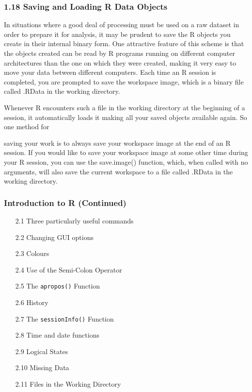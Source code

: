 \documentclass{beamer}
\begin{document}
 	\begin{frame}
 		\frametitle{1.18 Saving and Loading R Data Objects}
 		In situations where a good deal of processing must be used on a raw dataset in order to prepare
 		it for analysis, it may be prudent to save the R objects you create in their internal binary form.
 		One attractive feature of this scheme is that the objects created can be read by R programs
 		running on different computer architectures than the one on which they were created, making it
 		very easy to move your data between different computers. Each time an R session is completed,
 		you are prompted to save the workspace image, which is a binary file called .RData in the
 		working directory.
 	\end{frame}
 	\begin{frame}
 		Whenever R encounters such a file in the working directory at the beginning of a session,
 		it automatically loads it making all your saved objects available again. So one method for
 		
 		saving your work is to always save your workspace image at the end of an R session. If you
 		would like to save your workspace image at some other time during your R session, you can use
 		the save.image() function, which, when called with no arguments, will also save the current
 		workspace to a file called .RData in the working directory.
 		
 	\end{frame}
 	\begin{frame}
 		\frametitle{Introduction to R (Continued) }
 		\begin{itemize}
 			\item[2.1] Three particularly useful commands    
 			\item[2.2] Changing GUI options     
 			\item[2.3] Colours      
 			\item[2.4] Use of the Semi-Colon Operator     
 			\item[2.5] The \texttt{apropos()} Function     
 			\item[2.6] History       
 			\item[2.7] The \texttt{sessionInfo()} Function     
 			\item[2.8] Time and date functions     
 			\item[2.9] Logical States      
 			\item[2.10] Missing Data      
 			\item[2.11] Files in the Working Directory     
 		\end{itemize}
 	\end{frame}
 	
\end{document}
